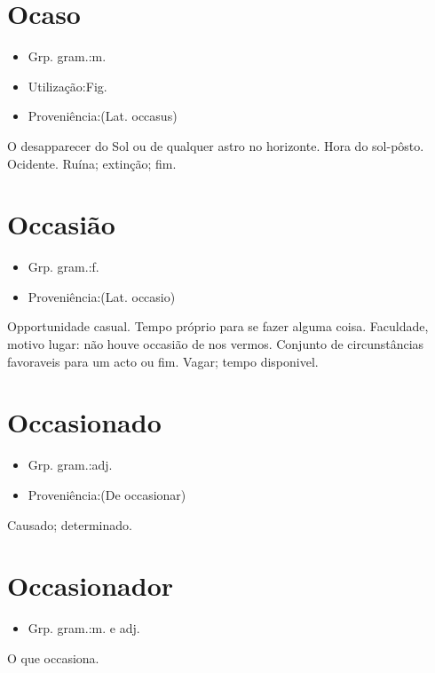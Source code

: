 \section{Ocaso}
\begin{itemize}
\item {Grp. gram.:m.}
\end{itemize}
\begin{itemize}
\item {Utilização:Fig.}
\end{itemize}
\begin{itemize}
\item {Proveniência:(Lat. \textunderscore occasus\textunderscore )}
\end{itemize}
O desapparecer do Sol ou de qualquer astro no horizonte.
Hora do sol-pôsto.
Ocidente.
Ruína; extinção; fim.
\section{Occasião}
\begin{itemize}
\item {Grp. gram.:f.}
\end{itemize}
\begin{itemize}
\item {Proveniência:(Lat. \textunderscore occasio\textunderscore )}
\end{itemize}
Opportunidade casual.
Tempo próprio para se fazer alguma coisa.
Faculdade, motivo lugar: \textunderscore não houve occasião de nos vermos\textunderscore .
Conjunto de circunstâncias favoraveis para um acto ou fim.
Vagar; tempo disponivel.
\section{Occasionado}
\begin{itemize}
\item {Grp. gram.:adj.}
\end{itemize}
\begin{itemize}
\item {Proveniência:(De \textunderscore occasionar\textunderscore )}
\end{itemize}
Causado; determinado.
\section{Occasionador}
\begin{itemize}
\item {Grp. gram.:m.  e  adj.}
\end{itemize}
O que occasiona.
